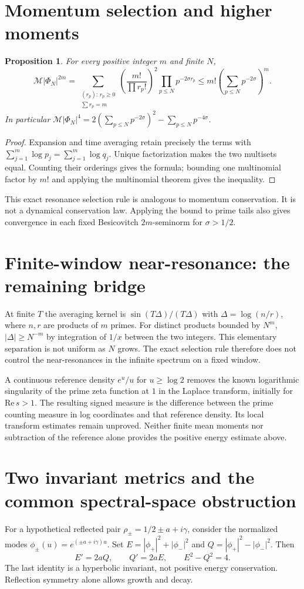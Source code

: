 \documentclass[11pt,a4paper]{article}
\newtheorem{proposition}{Proposition}[section]
\theoremstyle{definition}\newtheorem{definition}[proposition]{Definition}
\theoremstyle{remark}\newtheorem{remark}[proposition]{Remark}
\begin{document}
\section{Momentum selection and higher moments}
\begin{proposition}
For every positive integer $m$ and finite $N$,
\[
\mathcal M|\Phi_N|^{2m}
=\sum_{\substack{(r_p):\,r_p\ge0\\\sum r_p=m}}
\left(\frac{m!}{\prod r_p!}\right)^2
\prod_{p\le N}p^{-2\sigma r_p}
\le m!\left(\sum_{p\le N}p^{-2\sigma}\right)^m.
\]
In particular $\mathcal M|\Phi_N|^4=2(\sum_{p\le N}p^{-2\sigma})^2-\sum_{p\le N}p^{-4\sigma}$.
\end{proposition}
\begin{proof}
Expansion and time averaging retain precisely the terms with
$\sum_{j=1}^m\log p_j=\sum_{j=1}^m\log q_j$. Unique factorization makes the two multisets equal. Counting their orderings gives the formula; bounding one multinomial factor by $m!$ and applying the multinomial theorem gives the inequality.
\end{proof}
This exact resonance selection rule is analogous to momentum conservation. It is not a dynamical conservation law. Applying the bound to prime tails also gives convergence in each fixed Besicovitch $2m$-seminorm for $\sigma>1/2$.

\section{Finite-window near-resonance: the remaining bridge}
At finite $T$ the averaging kernel is $\sin(T\Delta)/(T\Delta)$ with $\Delta=\log(n/r)$, where $n,r$ are products of $m$ primes. For distinct products bounded by $N^m$, $|\Delta|\ge N^{-m}$ by integration of $1/x$ between the two integers. This elementary separation is not uniform as $N$ grows. The exact selection rule therefore does not control the near-resonances in the infinite spectrum on a fixed window.

A continuous reference density $e^u/u$ for $u\ge\log2$ removes the known logarithmic singularity of the prime zeta function at $1$ in the Laplace transform, initially for $\mathrm{Re}\,s>1$. The resulting signed measure is the difference between the prime counting measure in log coordinates and that reference density. Its local transform estimates remain unproved. Neither finite mean moments nor subtraction of the reference alone provides the positive energy estimate above.

\section{Two invariant metrics and the common spectral-space obstruction}
For a hypothetical reflected pair $\rho_\pm=1/2\pm a+i\gamma$, consider the normalized modes $\phi_\pm(u)=e^{(\pm a+i\gamma)u}$. Set $E=|\phi_+|^2+|\phi_-|^2$ and $Q=|\phi_+|^2-|\phi_-|^2$. Then
\[
E'=2aQ,\qquad Q'=2aE,\qquad E^2-Q^2=4.
\]
The last identity is a hyperbolic invariant, not positive energy conservation. Reflection symmetry alone allows growth and decay.
\end{document}
